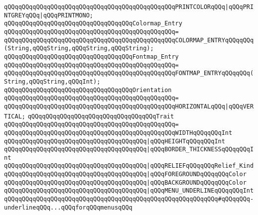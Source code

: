 \verb|qQQqqQQqqQQqqQQqqQQqqQQqqQQqqQQqqQQqqQQqqQQqqQQqPRINTCOLORqQQq|\verb#|qQQqPRINTGREYqQQq|qQQqPRINTMONO;#\newline
\newline
\verb|qQQqqQQqqQQqqQQqqQQqqQQqqQQqqQQqqQQqColormap_Entry|\newline
\verb|qQQqqQQqqQQqqQQqqQQqqQQqqQQqqQQqqQQqqQQqqQQqqQQq=|\newline
\verb|qQQqqQQqqQQqqQQqqQQqqQQqqQQqqQQqqQQqqQQqqQQqqQQqCOLORMAP_ENTRYqQQqqQQq(String,qQQqString,qQQqString,qQQqString);|\newline
\newline
\verb|qQQqqQQqqQQqqQQqqQQqqQQqqQQqqQQqqQQqFontmap_Entry|\newline
\verb|qQQqqQQqqQQqqQQqqQQqqQQqqQQqqQQqqQQqqQQqqQQqqQQq=|\newline
\verb|qQQqqQQqqQQqqQQqqQQqqQQqqQQqqQQqqQQqqQQqqQQqqQQqFONTMAP_ENTRYqQQqqQQq(String,qQQqString,qQQqInt);|\newline
\newline
\verb|qQQqqQQqqQQqqQQqqQQqqQQqqQQqqQQqqQQqOrientation|\newline
\verb|qQQqqQQqqQQqqQQqqQQqqQQqqQQqqQQqqQQqqQQqqQQqqQQq=|\newline
\verb|qQQqqQQqqQQqqQQqqQQqqQQqqQQqqQQqqQQqqQQqqQQqqQQqHORIZONTALqQQq|\verb#|qQQqVERTICAL;#\newline
\newline
\verb|qQQqqQQqqQQqqQQqqQQqqQQqqQQqqQQqqQQqTrait|\newline
\verb|qQQqqQQqqQQqqQQqqQQqqQQqqQQqqQQqqQQqqQQqqQQqqQQq=|\newline
\verb|qQQqqQQqqQQqqQQqqQQqqQQqqQQqqQQqqQQqqQQqqQQqqQQqWIDTHqQQqqQQqInt|\newline
\verb|qQQqqQQqqQQqqQQqqQQqqQQqqQQqqQQqqQQqqQQq|\verb#|qQQqHEIGHTqQQqqQQqInt#\newline
\verb|qQQqqQQqqQQqqQQqqQQqqQQqqQQqqQQqqQQqqQQq|\verb#|qQQqBORDER_THICKNESSqQQqqQQqInt#\newline
\verb|qQQqqQQqqQQqqQQqqQQqqQQqqQQqqQQqqQQqqQQq|\verb#|qQQqRELIEFqQQqqQQqRelief_Kind#\newline
\verb|qQQqqQQqqQQqqQQqqQQqqQQqqQQqqQQqqQQqqQQq|\verb#|qQQqFOREGROUNDqQQqqQQqColor#\newline
\verb|qQQqqQQqqQQqqQQqqQQqqQQqqQQqqQQqqQQqqQQq|\verb#|qQQqBACKGROUNDqQQqqQQqColor#\newline
\verb|qQQqqQQqqQQqqQQqqQQqqQQqqQQqqQQqqQQqqQQq|\verb#|qQQqMENU_UNDERLINEqQQqqQQqIntqQQqqQQqqQQqqQQqqQQqqQQqqQQqqQQqqQQqqQQqqQQqqQQqqQQqqQQqqQQq#\verb|#qQQqqQQq-underlineqQQq...qQQqforqQQqmenusqQQq|\newline
